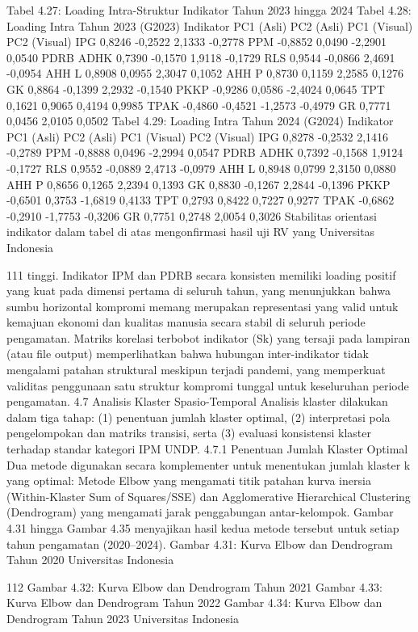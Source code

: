 Tabel 4.27: Loading Intra-Struktur Indikator Tahun 2023 hingga 2024
Tabel 4.28: Loading Intra Tahun 2023
(G2023)
Indikator PC1 (Asli) PC2 (Asli) PC1 (Visual) PC2 (Visual)
IPG 0,8246 -0,2522 2,1333 -0,2778
PPM -0,8852 0,0490 -2,2901 0,0540
PDRB ADHK 0,7390 -0,1570 1,9118 -0,1729
RLS 0,9544 -0,0866 2,4691 -0,0954
AHH L 0,8908 0,0955 2,3047 0,1052
AHH P 0,8730 0,1159 2,2585 0,1276
GK 0,8864 -0,1399 2,2932 -0,1540
PKKP -0,9286 0,0586 -2,4024 0,0645
TPT 0,1621 0,9065 0,4194 0,9985
TPAK -0,4860 -0,4521 -1,2573 -0,4979
GR 0,7771 0,0456 2,0105 0,0502
Tabel 4.29: Loading Intra Tahun 2024
(G2024)
Indikator PC1 (Asli) PC2 (Asli) PC1 (Visual) PC2 (Visual)
IPG 0,8278 -0,2532 2,1416 -0,2789
PPM -0,8888 0,0496 -2,2994 0,0547
PDRB ADHK 0,7392 -0,1568 1,9124 -0,1727
RLS 0,9552 -0,0889 2,4713 -0,0979
AHH L 0,8948 0,0799 2,3150 0,0880
AHH P 0,8656 0,1265 2,2394 0,1393
GK 0,8830 -0,1267 2,2844 -0,1396
PKKP -0,6501 0,3753 -1,6819 0,4133
TPT 0,2793 0,8422 0,7227 0,9277
TPAK -0,6862 -0,2910 -1,7753 -0,3206
GR 0,7751 0,2748 2,0054 0,3026
Stabilitas orientasi indikator dalam tabel di atas mengonfirmasi hasil uji RV yang
Universitas Indonesia

111
tinggi. Indikator IPM dan PDRB secara konsisten memiliki loading positif yang kuat pada
dimensi pertama di seluruh tahun, yang menunjukkan bahwa sumbu horizontal kompromi
memang merupakan representasi yang valid untuk kemajuan ekonomi dan kualitas manusia
secara stabil di seluruh periode pengamatan.
Matriks korelasi terbobot indikator (Sk) yang tersaji pada lampiran (atau file output)
memperlihatkan bahwa hubungan inter-indikator tidak mengalami patahan struktural
meskipun terjadi pandemi, yang memperkuat validitas penggunaan satu struktur kompromi
tunggal untuk keseluruhan periode pengamatan.
4.7 Analisis Klaster Spasio-Temporal
Analisis klaster dilakukan dalam tiga tahap: (1) penentuan jumlah klaster optimal, (2)
interpretasi pola pengelompokan dan matriks transisi, serta (3) evaluasi konsistensi klaster
terhadap standar kategori IPM UNDP.
4.7.1 Penentuan Jumlah Klaster Optimal
Dua metode digunakan secara komplementer untuk menentukan jumlah klaster k yang
optimal: Metode Elbow yang mengamati titik patahan kurva inersia (Within-Klaster Sum of
Squares/SSE) dan Agglomerative Hierarchical Clustering (Dendrogram) yang mengamati
jarak penggabungan antar-kelompok. Gambar 4.31 hingga Gambar 4.35 menyajikan hasil
kedua metode tersebut untuk setiap tahun pengamatan (2020–2024).
Gambar 4.31: Kurva Elbow dan Dendrogram Tahun 2020
Universitas Indonesia

112
Gambar 4.32: Kurva Elbow dan Dendrogram Tahun 2021
Gambar 4.33: Kurva Elbow dan Dendrogram Tahun 2022
Gambar 4.34: Kurva Elbow dan Dendrogram Tahun 2023
Universitas Indonesia

